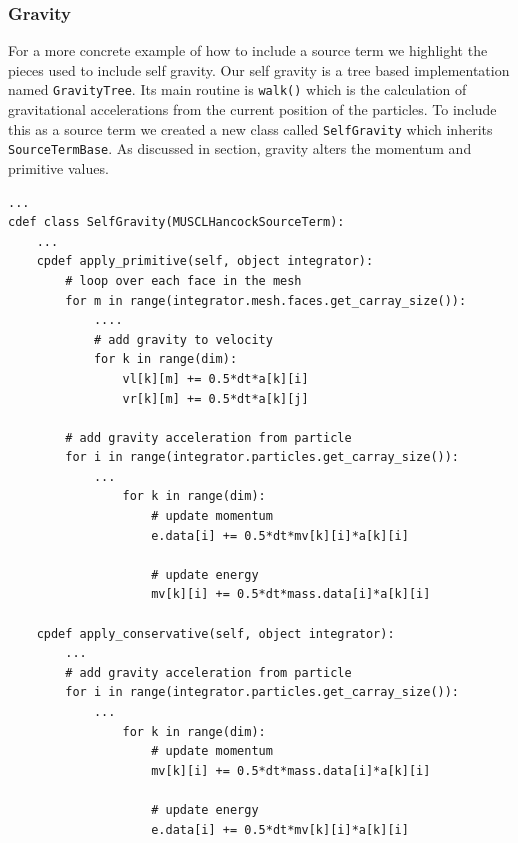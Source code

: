 \subsubsection{Gravity}
For a more concrete example of how to include a source term we highlight the
pieces used to include self gravity. Our self gravity is a tree based implementation
named \lstinline{GravityTree}. Its main routine is \lstinline{walk()} which is the
calculation of gravitational accelerations from the current position of the particles.
To include this as a source term we created a new class called \lstinline{SelfGravity}
which inherits \lstinline{SourceTermBase}. As discussed in section, gravity alters
the momentum and primitive values.
\begin{lstlisting}
...
cdef class SelfGravity(MUSCLHancockSourceTerm):
    ...
    cpdef apply_primitive(self, object integrator):
        # loop over each face in the mesh 
        for m in range(integrator.mesh.faces.get_carray_size()):
            ....
            # add gravity to velocity
            for k in range(dim):
                vl[k][m] += 0.5*dt*a[k][i]
                vr[k][m] += 0.5*dt*a[k][j]

        # add gravity acceleration from particle
        for i in range(integrator.particles.get_carray_size()):
            ...
                for k in range(dim):
                    # update momentum
                    e.data[i] += 0.5*dt*mv[k][i]*a[k][i]

                    # update energy 
                    mv[k][i] += 0.5*dt*mass.data[i]*a[k][i]

    cpdef apply_conservative(self, object integrator):
        ...
        # add gravity acceleration from particle
        for i in range(integrator.particles.get_carray_size()):
            ...
                for k in range(dim):
                    # update momentum
                    mv[k][i] += 0.5*dt*mass.data[i]*a[k][i]

                    # update energy 
                    e.data[i] += 0.5*dt*mv[k][i]*a[k][i]
\end{lstlisting}
